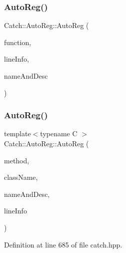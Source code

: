 \subsubsection{\texorpdfstring{Auto\+Reg()}{AutoReg()}\hspace{0.1cm}{\footnotesize\ttfamily [1/2]}}
{\footnotesize\ttfamily Catch\+::\+Auto\+Reg\+::\+Auto\+Reg (\begin{DoxyParamCaption}\item[{\hyperlink{namespace_catch_a26414f52d0835939fae52aadd27e6257}{Test\+Function}}]{function,  }\item[{\hyperlink{struct_catch_1_1_source_line_info}{Source\+Line\+Info} const \&}]{line\+Info,  }\item[{\hyperlink{struct_catch_1_1_name_and_desc}{Name\+And\+Desc} const \&}]{name\+And\+Desc }\end{DoxyParamCaption})}

\hypertarget{struct_catch_1_1_auto_reg_a1bf9207fe0a02b46dc0ab1cc03cbe738}{}\label{struct_catch_1_1_auto_reg_a1bf9207fe0a02b46dc0ab1cc03cbe738} 
\subsubsection{\texorpdfstring{Auto\+Reg()}{AutoReg()}\hspace{0.1cm}{\footnotesize\ttfamily [2/2]}}
{\footnotesize\ttfamily template$<$typename C $>$ \\
Catch\+::\+Auto\+Reg\+::\+Auto\+Reg (\begin{DoxyParamCaption}\item[{void(C\+::$\ast$)()}]{method,  }\item[{char const $\ast$}]{class\+Name,  }\item[{\hyperlink{struct_catch_1_1_name_and_desc}{Name\+And\+Desc} const \&}]{name\+And\+Desc,  }\item[{\hyperlink{struct_catch_1_1_source_line_info}{Source\+Line\+Info} const \&}]{line\+Info }\end{DoxyParamCaption})\hspace{0.3cm}{\ttfamily [inline]}}



Definition at line 685 of file catch.\+hpp.

\hypertarget{struct_catch_1_1_auto_reg_a3cdb53f1e5ff115310f3372bebe198f1}{}\label{struct_catch_1_1_auto_reg_a3cdb53f1e5ff115310f3372bebe198f1} 
